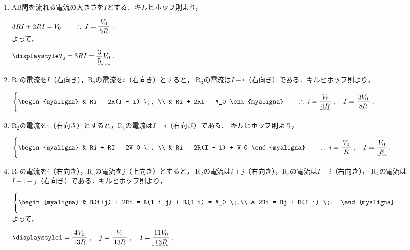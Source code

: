 \documentclass[../../../uem_phy_std_a.tex]{subfiles}
\begin{document}
    \begin{enumerate}
        \item AB間を流れる電流の大きさを$I$とする．キルヒホッフ則より，
        
            \myspaceb%
            $\displaystyle%
                3RI + 2RI = V_0 \qquad \therefore \; I = \myfracc{V_0}{5R} \;.
            $\\
            よって，
            
            \myspaceb%
            $\displaystyle%
                V_{2} = 3RI = \uwave{\myfraca{3}{5}V_0} \;.
            $
        \item R$_1$の電流を$I$（右向き），R$_2$の電流を$i$（右向き）とすると，
            R$_3$の電流は$I - i$（右向き）である．キルヒホッフ則より，
        
            \myspaceb%
            $\displaystyle%
                \Biggl\{%
                \begin{myaligna}
                    & Ri = 2R(I - i) \;, \\
                    & Ri + 2RI = V_0
                \end{myaligna}
                \qquad \therefore \; i=\uwave{\myfracc{V_0}{4R}} \;,
                \quad I = \myfracc{3V_0}{8R} \;.
            $
        \item R$_2$の電流を$i$（右向き）とすると，R$_3$の電流は$I-i$（右向き）である．
            キルヒホッフ則より，

            \myspaceb%
            $\displaystyle%
                \Biggl\{%
                \begin{myaligna}
                    & Ri + RI = 2V_0 \;, \\
                    & Ri = 2R(I - i) + V_0
                \end{myaligna}
                \qquad \therefore \; i=\myfracc{V_0}{R} \;,
                \quad I = \uwave{\myfracc{V_0}{R}} \;.
            $
        \item R$_1$の電流を$i$（右向き），R$_5$の電流を$j$（上向き）とすると，
            R$_2$の電流は$i+j$（右向き），R$_3$の電流は$I-i$（右向き），
            R$_4$の電流は$I-i-j$（右向き）である．キルヒホッフ則より，
                    
            \myspaceb%
            $\displaystyle%
                \Biggl\{%
                \begin{myaligna}
                    & R(i+j) + 2Ri = R(I-i-j) + R(I-i) = V_0 \;,\\
                    & 2Ri = Rj + R(I-i) \;.
                \end{myaligna}
            $\\
            よって，
            
            \myspaceb%
            $\displaystyle%
                i = \myfracc{4V_0}{13R} \;, \quad j = \myfracc{V_0}{13R} \;,
                \quad I = \uwave{\myfracc{11V_0}{13R}} \;.
            $
    \end{enumerate}
\end{document}
